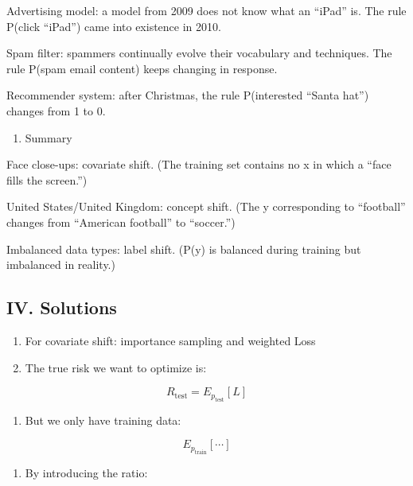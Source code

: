Advertising model: a model from 2009 does not know what an ``iPad'' is. The rule P(click \textbar{} ``iPad'') came into existence in 2010.

Spam filter: spammers continually evolve their vocabulary and techniques. The rule P(spam \textbar{} email content) keeps changing in response.

Recommender system: after Christmas, the rule P(interested \textbar{} ``Santa hat'') changes from 1 to 0.

\begin{enumerate}
\def\labelenumi{\arabic{enumi}.}
\setcounter{enumi}{3}
\tightlist
\item
  Summary
\end{enumerate}

Face close-ups: covariate shift. (The training set contains no x in which a ``face fills the screen.'')

United States/United Kingdom: concept shift. (The y corresponding to ``football'' changes from ``American football'' to ``soccer.'')

Imbalanced data types: label shift. (P(y) is balanced during training but imbalanced in reality.)

\hypertarget{iv.-solutions}{%
\subsection{IV. Solutions}\label{iv.-solutions}}

\begin{enumerate}
\def\labelenumi{\arabic{enumi}.}
\item
  For covariate shift: importance sampling and weighted Loss
\item
{}
  The true risk we want to optimize is:
\end{enumerate}

\[
R_{\mathrm{test}}=E_{p_{\mathrm{test}}}[L]
\]

\begin{enumerate}
\def\labelenumi{\arabic{enumi}.}
\setcounter{enumi}{1}
\tightlist
\item
{}
  But we only have training data:
\end{enumerate}

\[
E_{p_{\mathrm{train}}}[\cdots]
\]

\begin{enumerate}
\def\labelenumi{\arabic{enumi}.}
\setcounter{enumi}{2}
\tightlist
\item
{}
  By introducing the ratio:
\end{enumerate}

